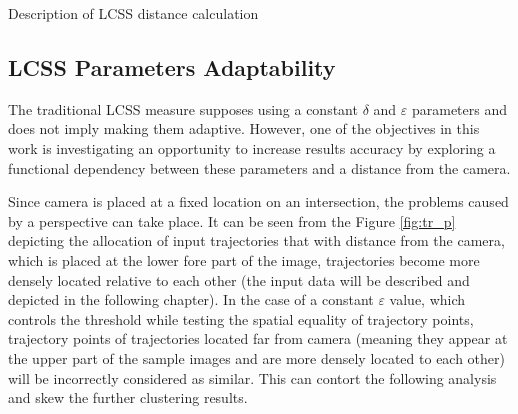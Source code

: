 \begin{algorithm}[!htb]
	\caption{Description of LCSS distance calculation}
	\label{algo:lcss-descr}
	\SetAlgoLined
\end{algorithm}

\subsection{LCSS Parameters Adaptability}

The traditional LCSS measure supposes using a constant $\delta$ and $\varepsilon$ parameters and does not imply making them adaptive. However, one of the objectives in this work is investigating an opportunity to increase results accuracy by exploring a functional dependency between these parameters and a distance from the camera. 

Since camera is placed at a fixed location on an intersection, the problems caused by a perspective can take place. It can be seen from the Figure \ref{fig:tr_p} depicting the allocation of input trajectories that with distance from the camera, which is placed at the lower fore part of the image, trajectories become more densely located relative to each other (the input data will be described and depicted in the following chapter). In the case of a constant $\varepsilon$ value, which controls the threshold while testing the spatial equality of trajectory points, trajectory points of trajectories located far from camera (meaning they appear at the upper part of the sample images and are more densely located to each other) will be incorrectly considered as similar. This can contort the following analysis and skew the further clustering results.

